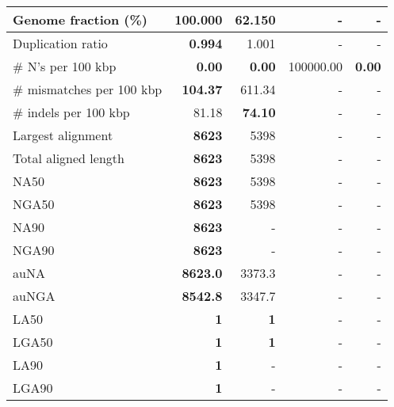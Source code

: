 \documentclass[12pt,a4paper]{article}
\begin{document}
\begin{table}[ht]
\begin{center}
\begin{tabular}{|l*{4}{|r}|}
Genome fraction (\%) & {\bf 100.000} & 62.150 & - & - \\ \hline
Duplication ratio & {\bf 0.994} & 1.001 & - & - \\ \hline
\# N's per 100 kbp & {\bf 0.00} & {\bf 0.00} & 100000.00 & {\bf 0.00} \\ \hline
\# mismatches per 100 kbp & {\bf 104.37} & 611.34 & - & - \\ \hline
\# indels per 100 kbp & 81.18 & {\bf 74.10} & - & - \\ \hline
Largest alignment & {\bf 8623} & 5398 & - & - \\ \hline
Total aligned length & {\bf 8623} & 5398 & - & - \\ \hline
NA50 & {\bf 8623} & 5398 & - & - \\ \hline
NGA50 & {\bf 8623} & 5398 & - & - \\ \hline
NA90 & {\bf 8623} & - & - & - \\ \hline
NGA90 & {\bf 8623} & - & - & - \\ \hline
auNA & {\bf 8623.0} & 3373.3 & - & - \\ \hline
auNGA & {\bf 8542.8} & 3347.7 & - & - \\ \hline
LA50 & {\bf 1} & {\bf 1} & - & - \\ \hline
LGA50 & {\bf 1} & {\bf 1} & - & - \\ \hline
LA90 & {\bf 1} & - & - & - \\ \hline
LGA90 & {\bf 1} & - & - & - \\ \hline
\end{tabular}
\end{center}
\end{table}
\end{document}
